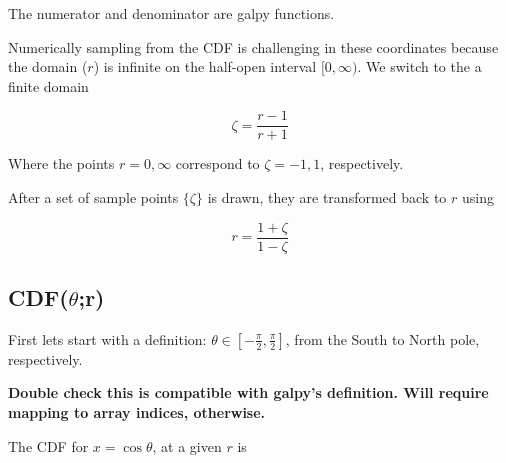 \documentclass[12pt, english]{article}
\begin{document}
        The numerator and denominator are galpy functions.

        Numerically sampling from the CDF is challenging in these coordinates because the domain ($r$) is infinite on the half-open interval $[0, \infty)$. We switch to the a finite domain

        \begin{equation}\label{eq:ho_2_15}
         \zeta = \frac{r-1}{r+1}
        \end{equation}

        Where the points $r=0, \infty$ correspond to $\zeta=-1, 1$, respectively.

        After a set of sample points $\{\zeta\}$ is drawn, they are transformed back to $r$ using

        \begin{equation}\label{eq:ho_2_16}
         r = \frac{1+\zeta}{1-\zeta}
        \end{equation}



    \subsection[CDF(theta;r)]{CDF($\theta$;r)} %
    \label{sub:cdf_theta}

        First lets start with a definition: $\theta \in [-\frac{\pi}{2}, \frac{\pi}{2}]$, from the South to North pole, respectively.

        \textbf{Double check this is compatible with galpy's definition. Will require mapping to array indices, otherwise.}
        \vspace{10pt}

        The CDF for $x=\cos{\theta}$, at a given $r$ is
\end{document}
